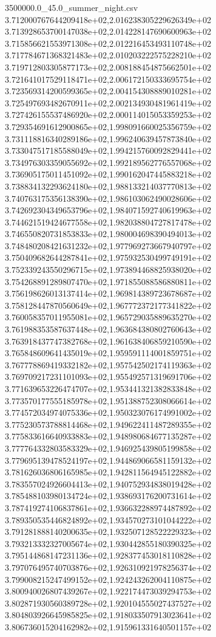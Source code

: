 \begin{filecontents*}{3500000.0_45.0_summer_night.csv}
3.712000767644209418e+02,2.016238305229626349e+02
3.713928653700147038e+02,2.014228147690600963e+02
3.715856621553971308e+02,2.012216453493110748e+02
3.717784671368321483e+02,2.010203222575228210e+02
3.719712803305877173e+02,2.008188454875662501e+02
3.721641017529118471e+02,2.006172150333695754e+02
3.723569314200599365e+02,2.004154308889010281e+02
3.725497693482670911e+02,2.002134930481961419e+02
3.727426155537486920e+02,2.000114015053359253e+02
3.729354691612900865e+02,1.998091660025356759e+02
3.731118816340289186e+02,1.996240639457873840e+02
3.733047517185588049e+02,1.994215760092829441e+02
3.734976303359055692e+02,1.992189562776557068e+02
3.736905175011451092e+02,1.990162047445883218e+02
3.738834132293624180e+02,1.988133214037770813e+02
3.740763175356138390e+02,1.986103062490028606e+02
3.742692304349653796e+02,1.984071592740619963e+02
3.744621519424677558e+02,1.982038804727817478e+02
3.746550820731853833e+02,1.980004698390494013e+02
3.748480208421631232e+02,1.977969273667940797e+02
3.750409682644287841e+02,1.975932530499749191e+02
3.752339243550296715e+02,1.973894468825938020e+02
3.754268891289807470e+02,1.971855088586880811e+02
3.756198626013137414e+02,1.969814389723678687e+02
3.758128447870560649e+02,1.967772372177341822e+02
3.760058357011955081e+02,1.965729035889635270e+02
3.761988353587637448e+02,1.963684380802760643e+02
3.763918437747382768e+02,1.961638406859210590e+02
3.765848609641435019e+02,1.959591114001859751e+02
3.767778869419332182e+02,1.957542502174119363e+02
3.769709217231101093e+02,1.955492571319691706e+02
3.771639653226474707e+02,1.953441321382833848e+02
3.773570177555185978e+02,1.951388752308066614e+02
3.774572034974075336e+02,1.950323076174991002e+02
3.775230573788814468e+02,1.949622411487289355e+02
3.775833616640933883e+02,1.948980684677135287e+02
3.777764332803583329e+02,1.946925439805199858e+02
3.779695139478524197e+02,1.944869066581159132e+02
3.781626036806165985e+02,1.942811564945122882e+02
3.783557024926604413e+02,1.940752934838019428e+02
3.785488103980134724e+02,1.938693176200731614e+02
3.787419274106837861e+02,1.936632288974487892e+02
3.789350535446824892e+02,1.934570273101044222e+02
3.791281888140200635e+02,1.932507128522229323e+02
3.793213332327005674e+02,1.930442855180390325e+02
3.795144868147231136e+02,1.928377453018110828e+02
3.797076495740703876e+02,1.926310921978256374e+02
3.799008215247499152e+02,1.924243262004110875e+02
3.800940026807439267e+02,1.922174473039294753e+02
3.802871930560389728e+02,1.920104555027437527e+02
3.804803926645985825e+02,1.918033507913023641e+02
3.806736015204162982e+02,1.915961331640501157e+02

\end{filecontents*}
